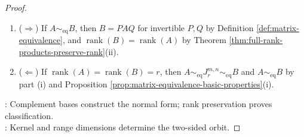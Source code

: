 \begin{theorem}
\begin{proof}
\begin{enumerate}[label=(\roman*)]
The first $r$ basis vectors map to the first $r$ vectors of $\gamma_A$, while the remaining basis vectors lie in $\ker(T_A)$.\\
Thus $[T_A]_{\gamma_A\leftarrow\beta_A}=J_r^{m,n}$ by Definition \ref{def:matrix-representation-of-linear-map} and Definition \ref{def:matrix-rank-normal-form}.\\
The standard-basis matrix of $T_A$ is $A$ by Definition \ref{def:linear-map-induced-by-matrix} and Definition \ref{def:matrix-representation-of-linear-map}. Therefore $A\sim_{\mathrm{eq}}J_r^{m,n}$ by Theorem \ref{thm:matrix-equivalence-same-linear-map}.
\item[$(ii)$] ($\Rightarrow$) If $A\sim_{\mathrm{eq}}B$, then $B=PAQ$ for invertible $P,Q$ by Definition \ref{def:matrix-equivalence}, and $\operatorname{rank}(B)=\operatorname{rank}(A)$ by Theorem \ref{thm:full-rank-products-preserve-rank}(ii).
\item[$(ii)$] ($\Leftarrow$) If $\operatorname{rank}(A)=\operatorname{rank}(B)=r$, then $A\sim_{\mathrm{eq}}J_r^{m,n}\sim_{\mathrm{eq}}B$ and $A\sim_{\mathrm{eq}}B$ by part (i) and Proposition \ref{prop:matrix-equivalence-basic-properties}(i).
\end{enumerate}
: Complement bases construct the normal form; rank preservation proves classification.\\
: Kernel and range dimensions determine the two-sided orbit.
\end{proof}
\end{theorem}

